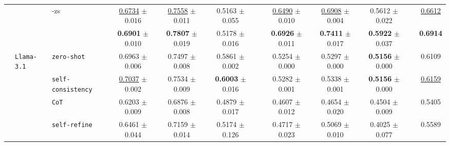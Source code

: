 \begin{table}[ht]
\begin{adjustbox}{max width=\textwidth}
\begin{tabular}{@{}l l l ccc p{0.15cm} ccc p{0.15cm} c@{}}
        & & \cellcolor{methodrow} \method{}-zs          & \cellcolor{methodrow} \underline{0.6734} {\tiny$\pm$ 0.016} & \cellcolor{methodrow} \underline{0.7558} {\tiny$\pm$ 0.011} & \cellcolor{methodrow} 0.5163 {\tiny$\pm$ 0.055}  & & \cellcolor{methodrow} \underline{0.6490} {\tiny$\pm$ 0.010} & \cellcolor{methodrow} \underline{0.6908} {\tiny$\pm$ 0.004} & \cellcolor{methodrow} 0.5612 {\tiny$\pm$ 0.022}  & & \cellcolor{avgall!85}\underline{0.6612} \\
        & & \cellcolor{methodrow} \method{}                    & \cellcolor{methodrow} \textbf{0.6901} {\tiny$\pm$ 0.010} & \cellcolor{methodrow} \textbf{0.7807} {\tiny$\pm$ 0.019} & \cellcolor{methodrow} 0.5178 {\tiny$\pm$ 0.016}  & & \cellcolor{methodrow} \textbf{0.6926} {\tiny$\pm$ 0.011} & \cellcolor{methodrow} \textbf{0.7411} {\tiny$\pm$ 0.017} & \cellcolor{methodrow} \textbf{0.5922} {\tiny$\pm$ 0.037}  & & \cellcolor{avgall!85}\textbf{0.6914} \\
        \cmidrule(lr){2-10}
        & \multirow{7}{*}{\texttt{Llama-3.1}}
          & \cellcolor{white} \texttt{zero-shot}               & \cellcolor{white} 0.6963 {\tiny$\pm$ 0.006} & \cellcolor{white} 0.7497 {\tiny$\pm$ 0.008} & \cellcolor{white} 0.5861 {\tiny$\pm$ 0.002}  & & \cellcolor{white} 0.5254 {\tiny$\pm$ 0.000} & \cellcolor{white} 0.5297 {\tiny$\pm$ 0.000} & \cellcolor{white} \textbf{0.5156} {\tiny$\pm$ 0.000}  & & \cellcolor{avgall!85}0.6109 \\
        & & \cellcolor{altrow} \texttt{self-consistency}       & \cellcolor{altrow} \underline{0.7037} {\tiny$\pm$ 0.002} & \cellcolor{altrow} 0.7534 {\tiny$\pm$ 0.009} & \cellcolor{altrow} \textbf{0.6003} {\tiny$\pm$ 0.016}  & & \cellcolor{altrow} 0.5282 {\tiny$\pm$ 0.001} & \cellcolor{altrow} 0.5338 {\tiny$\pm$ 0.001} & \cellcolor{altrow} \textbf{0.5156} {\tiny$\pm$ 0.000}  & & \cellcolor{avgall!85}\underline{0.6159} \\
        & & \cellcolor{white} \texttt{CoT}                    & \cellcolor{white} 0.6203 {\tiny$\pm$ 0.009} & \cellcolor{white} 0.6876 {\tiny$\pm$ 0.008} & \cellcolor{white} 0.4879 {\tiny$\pm$ 0.017}  & & \cellcolor{white} 0.4607 {\tiny$\pm$ 0.012} & \cellcolor{white} 0.4654 {\tiny$\pm$ 0.020} & \cellcolor{white} 0.4504 {\tiny$\pm$ 0.009}  & & \cellcolor{avgall!85}0.5405 \\
        & & \cellcolor{altrow} \texttt{self-refine}            & \cellcolor{altrow} 0.6461 {\tiny$\pm$ 0.044} & \cellcolor{altrow} 0.7159 {\tiny$\pm$ 0.014} & \cellcolor{altrow} 0.5174 {\tiny$\pm$ 0.126}  & & \cellcolor{altrow} 0.4717 {\tiny$\pm$ 0.023} & \cellcolor{altrow} 0.5069 {\tiny$\pm$ 0.010} & \cellcolor{altrow} 0.4025 {\tiny$\pm$ 0.077}  & & \cellcolor{avgall!85}0.5589 \\

\end{tabular}
\end{adjustbox}
\end{table}
